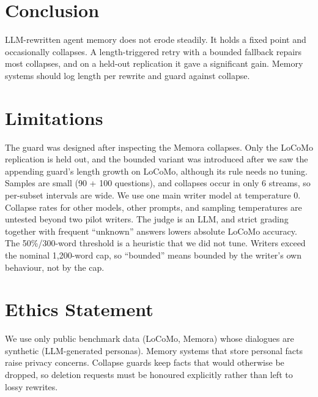 \documentclass[11pt]{article}
\begin{document}
\section{Conclusion}
LLM-rewritten agent memory does not erode steadily. It holds a fixed point and occasionally collapses. A length-triggered retry with a bounded fallback repairs most collapses, and on a held-out replication it gave a significant gain. Memory systems should log length per rewrite and guard against collapse.

\section*{Limitations}
The guard was designed after inspecting the Memora collapses. Only the LoCoMo replication is held out, and the bounded variant was introduced after we saw the appending guard's length growth on LoCoMo, although its rule needs no tuning. Samples are small (90 + 100 questions), and collapses occur in only 6 streams, so per-subset intervals are wide. We use one main writer model at temperature 0. Collapse rates for other models, other prompts, and sampling temperatures are untested beyond two pilot writers. The judge is an LLM, and strict grading together with frequent ``unknown'' answers lowers absolute LoCoMo accuracy. The 50\%/300-word threshold is a heuristic that we did not tune. Writers exceed the nominal 1,200-word cap, so ``bounded'' means bounded by the writer's own behaviour, not by the cap.

\section*{Ethics Statement}
We use only public benchmark data (LoCoMo, Memora) whose dialogues are synthetic (LLM-generated personas). Memory systems that store personal facts raise privacy concerns. Collapse guards keep facts that would otherwise be dropped, so deletion requests must be honoured explicitly rather than left to lossy rewrites.


\end{document}
